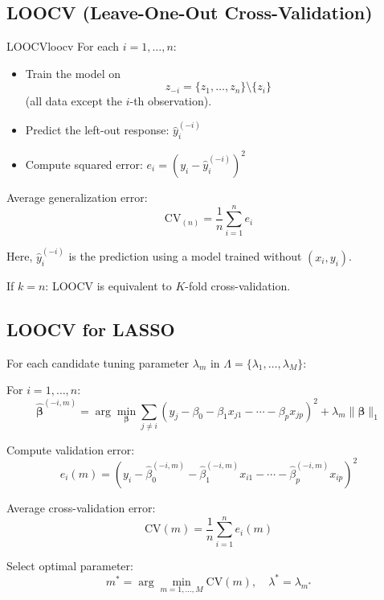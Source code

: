 \subsection{LOOCV (Leave-One-Out Cross-Validation)}

\begin{defn}{LOOCV}{loocv}
For each $i = 1, \dots, n$:
\begin{itemize}
\item Train the model on
\[
z_{-i} = \{z_1, \dots, z_n\} \setminus \{z_i\}
\]
(all data except the $i$-th observation).

\item Predict the left-out response: $\hat{y}_i^{(-i)}$

\item Compute squared error: $e_i = (y_i - \hat{y}_i^{(-i)})^2$
\end{itemize}

Average generalization error:
\[
\mathrm{CV}_{(n)} = \frac{1}{n} \sum_{i=1}^n e_i
\]

Here, $\hat{y}_i^{(-i)}$ is the prediction using a model trained without $(x_i, y_i)$.
\end{defn}

\begin{notebox}
If $k = n$: LOOCV is equivalent to $K$-fold cross-validation.
\end{notebox}

\subsection{LOOCV for LASSO}

For each candidate tuning parameter $\lambda_m$ in $\Lambda = \{\lambda_1, \dots, \lambda_M\}$:

\begin{keyresult}
For $i = 1, \dots, n$:
\[
\hat{\boldsymbol{\beta}}^{(-i,m)}
= \arg\min_{\boldsymbol{\beta}}
\sum_{j \ne i}
\left(y_j - \beta_0 - \beta_1 x_{j1} - \cdots - \beta_p x_{jp}\right)^2
+ \lambda_m \|\boldsymbol{\beta}\|_1
\]

Compute validation error:
\[
e_i(m) = \left(y_i - \hat{\beta}_0^{(-i,m)} - \hat{\beta}_1^{(-i,m)} x_{i1} - \cdots - \hat{\beta}_p^{(-i,m)} x_{ip}\right)^2
\]

Average cross-validation error:
\[
\mathrm{CV}(m) = \frac{1}{n} \sum_{i=1}^n e_i(m)
\]

Select optimal parameter:
\[
m^* = \arg\min_{m=1,\dots,M} \mathrm{CV}(m), \quad \lambda^* = \lambda_{m^*}
\]
\end{keyresult}

